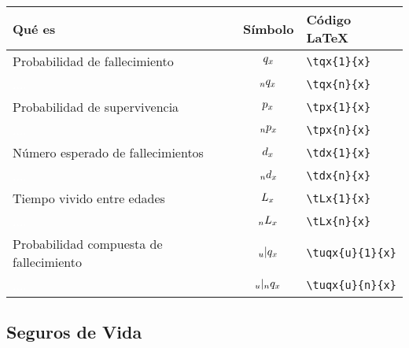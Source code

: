 \documentclass{article}
\begin{document}
\begin{tabularx}{\textwidth}{@{}l c X@{}}
    \toprule
        \textbf{Qué es} & \textbf{Símbolo} & \textbf{Código \LaTeX} \\
    \midrule
        Probabilidad de fallecimiento           & \( \tqx{1}{x} \)     & \texttt{\textbackslash tqx\{1\}\{x\}} \\
        \textcolor{white}{....}{}               & \( \tqx{n}{x} \)     & \texttt{\textbackslash tqx\{n\}\{x\}} \\
        Probabilidad de supervivencia           & \( \tpx{1}{x} \)     & \texttt{\textbackslash tpx\{1\}\{x\}} \\
        \textcolor{white}{....}{}               & \( \tpx{n}{x} \)     & \texttt{\textbackslash tpx\{n\}\{x\}} \\
        Número esperado de fallecimientos       & \( \tdx{1}{x} \)     & \texttt{\textbackslash tdx\{1\}\{x\}} \\
        \textcolor{white}{....}{}               & \( \tdx{n}{x} \)     & \texttt{\textbackslash tdx\{n\}\{x\}} \\
        Tiempo vivido entre edades              & \( \tLx{1}{x} \)     & \texttt{\textbackslash tLx\{1\}\{x\}} \\
        \textcolor{white}{....}{}               & \( \tLx{n}{x} \)     & \texttt{\textbackslash tLx\{n\}\{x\}} \\
        Probabilidad compuesta de fallecimiento & \( \tuqx{u}{1}{x} \) & \texttt{\textbackslash tuqx\{u\}\{1\}\{x\}} \\
        \textcolor{white}{....}{}               & \( \tuqx{u}{n}{x} \) & \texttt{\textbackslash tuqx\{u\}\{n\}\{x\}} \\
    \bottomrule
\end{tabularx}

\subsection{Seguros de Vida}
\end{document}
